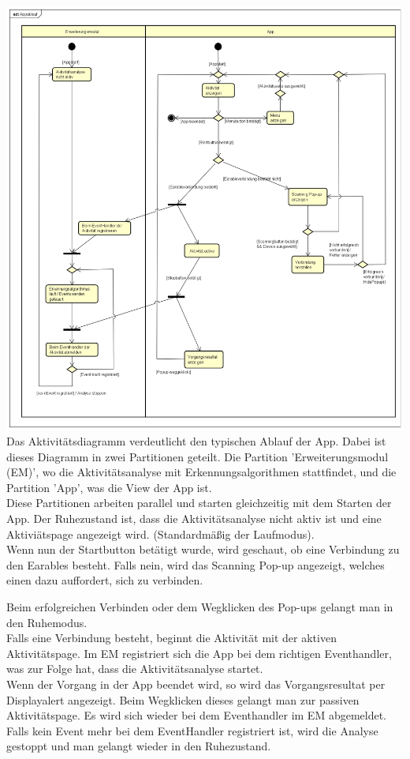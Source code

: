 \documentclass[a4paper,12pt]{article}
\begin{document}
\includegraphics[width=1.1\textwidth]{./Diagramme/Appablauf.png}\\

Das Aktivitätsdiagramm verdeutlicht den typischen Ablauf der App. Dabei ist dieses Diagramm in zwei Partitionen geteilt. Die Partition 'Erweiterungsmodul (EM)', wo die Aktivitätsanalyse mit Erkennungsalgorithmen stattfindet, und die  Partition 'App', was die View der App ist.\\
Diese Partitionen arbeiten parallel und starten gleichzeitig mit dem Starten der App. Der Ruhezustand ist, dass die Aktivitätsanalyse nicht aktiv ist und eine Aktiviätspage angezeigt wird. (Standardmäßig der Laufmodus).\\
Wenn nun der Startbutton betätigt wurde, wird geschaut, ob eine Verbindung zu den \Gls{Earables} besteht. Falls nein, wird das Scanning Pop-up angezeigt, welches einen dazu auffordert, sich zu verbinden.

Beim erfolgreichen Verbinden oder dem Wegklicken des Pop-ups gelangt man in den Ruhemodus.\\
Falls eine Verbindung besteht, beginnt die Aktivität mit der aktiven Aktivitätspage. Im EM registriert sich die App bei dem richtigen Eventhandler, was zur Folge hat, dass die Aktivitätsanalyse startet.\\
Wenn der Vorgang in der App beendet wird, so wird das Vorgangsresultat per Displayalert angezeigt. Beim Wegklicken dieses gelangt man zur passiven Aktivitätspage. Es wird sich wieder bei dem Eventhandler im EM abgemeldet.\\
Falls kein Event mehr bei dem EventHandler registriert ist, wird die Analyse gestoppt und man gelangt wieder in den Ruhezustand.\\
\newpage
\end{document}
